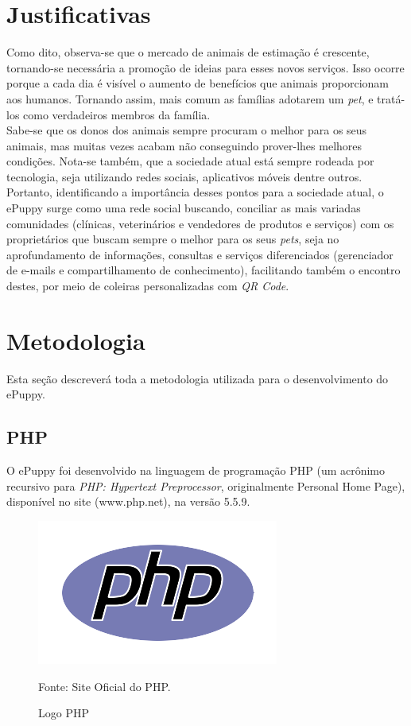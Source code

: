 \section{Justificativas}

Como dito, observa-se que o mercado de animais de estimação é crescente, tornando-se necessária a promoção de ideias para esses novos serviços. Isso ocorre porque a cada dia é visível o aumento de benefícios que animais proporcionam aos humanos. Tornando assim, mais comum as famílias adotarem um {\it pet}, e tratá-los como verdadeiros membros da família.
\\
\indent
Sabe-se que os donos dos animais sempre procuram o melhor para os seus animais, mas muitas vezes acabam não conseguindo prover-lhes melhores condições. Nota-se também, que a sociedade atual está sempre rodeada por tecnologia, seja utilizando redes sociais, aplicativos móveis dentre outros.
\\
\indent
Portanto, identificando a importância desses pontos para a sociedade atual, o ePuppy surge como uma rede social buscando, conciliar as mais variadas comunidades (clínicas, veterinários e vendedores de produtos e serviços) com os proprietários que buscam sempre o melhor para os seus {\it pets}, seja no aprofundamento de informações, consultas e serviços diferenciados (gerenciador de e-mails e compartilhamento de conhecimento), facilitando também o encontro destes, por meio de coleiras personalizadas com {\it QR Code}.

\section{Metodologia}
Esta seção descreverá toda a metodologia utilizada para o desenvolvimento do ePuppy.

\subsection{PHP}
O ePuppy foi desenvolvido na linguagem de programação PHP (um acrônimo recursivo para {\it PHP: Hypertext Preprocessor}, originalmente Personal Home Page), disponível no site (www.php.net), na versão 5.5.9. 

\begin{figure}[!htb]
	\centering
	\includegraphics[scale=0.50
	]{imagens/php_logo}
	\caption{Logo PHP}
	Fonte: Site Oficial do PHP.
	\label{Rotulo}
\end{figure}

